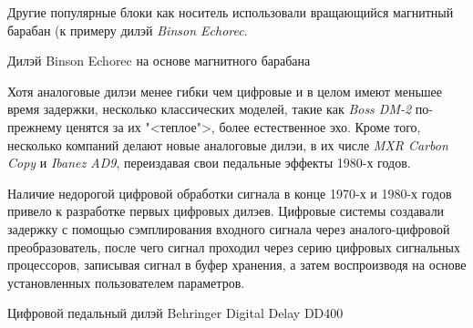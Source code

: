 \documentclass{beamer}
\begin{document}
\begin{frame}
  Другие популярные блоки как носитель использовали вращающийся магнитный барабан (к примеру дилэй \emph{Binson Echorec}. 
  
  \begin{block}{Дилэй Binson Echorec на основе магнитного барабана}
  \end{block}
  
  Хотя аналоговые дилэи менее гибки чем цифровые и в целом имеют меньшее время задержки, несколько классических моделей, такие как \emph{Boss DM-2} по-прежнему ценятся за их "<теплое">, более естественное эхо. Кроме того, несколько компаний делают новые аналоговые дилэи, в их числе \emph{MXR Carbon Copy} и \emph{Ibanez AD9}, переиздавая свои педальные эффекты 1980-х годов.
\end{frame}

\begin{frame}
  Наличие недорогой цифровой обработки сигнала в конце 1970-х и 1980-х годов привело к разработке первых цифровых дилэев. Цифровые системы создавали задержку с помощью сэмплирования входного сигнала через аналого-цифровой преобразователь, после чего сигнал проходил через серию цифровых сигнальных процессоров, записывая сигнал в буфер хранения, а затем воспроизводя на основе установленных пользователем параметров.

  \begin{block}{Цифровой педальный дилэй Behringer Digital Delay DD400}
  \end{block}
\end{frame}
\end{document}
